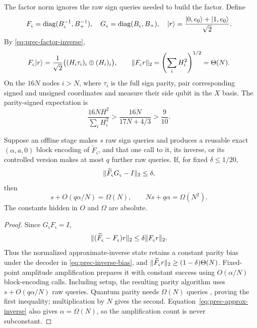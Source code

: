 The factor norm ignores the raw sign queries needed to build the factor.
Define
\begin{equation}
 F_\varsigma=\operatorname{diag}(B_\varsigma^{-1},B_+^{-1}),\quad
 G_\varsigma=\operatorname{diag}(B_\varsigma,B_+),\quad
 \lvert r\rangle=\frac{\lvert 0,e_0\rangle+\lvert 1,e_0\rangle}{\sqrt2}.            \label{eq:prec-FG}
\end{equation}
By \eqref{eq:prec-factor-inverse},
\begin{equation}
 F_\varsigma\lvert r\rangle
 =\frac1{\sqrt2}\bigl((H_i\tau_i)_i\oplus(H_i)_i\bigr),
 \qquad \lVert F_\varsigma r\rVert_2=\left(\sum_iH_i^2\right)^{1/2}=\Theta(N).
 \label{eq:prec-inverse-state}
\end{equation}
On the $16N$ nodes $i>N$, where $\tau_i$ is the full sign parity, pair
corresponding signed and unsigned coordinates and measure
their side qubit in the $X$ basis.  The parity-signed expectation is
\begin{equation}
 \frac{16NH^2}{\sum_iH_i^2}
 >\frac{16N}{17N+4/3}>\frac9{10}.             \label{eq:prec-inverse-bias}
\end{equation}

\begin{theorem}
\label{thm:prec-inverse-access}
Suppose an offline stage makes $s$ raw sign queries and produces a reusable
exact $(\alpha,a,0)$ block encoding of $\widetilde F_\varsigma$, and that one
call to it, its inverse, or its controlled version makes at most $q$ further
raw queries.
If, for fixed $\delta\leq1/20$,
\begin{equation}
 \lVert\widetilde F_\varsigma G_\varsigma-I\rVert_2\leq\delta, \label{eq:prec-inverse-promise}
\end{equation}
then
\begin{equation}
 \boxed{s+O(q\alpha/N)=\Omega(N)},\qquad
 \boxed{Ns+q\alpha=\Omega(N^2)}.             \label{eq:prec-inverse-product}
\end{equation}
The constants hidden in $O$ and $\Omega$ are absolute.
\end{theorem}

\begin{proof}
Since $G_\varsigma F_\varsigma=I$,
\[
 \lVert(\widetilde F_\varsigma-F_\varsigma)r\rVert_2
 \leq\delta\lVert F_\varsigma r\rVert_2.
\]
Thus the normalized approximate-inverse state retains a constant parity bias
under the decoder in \eqref{eq:prec-inverse-bias}, and
$\lVert\widetilde F_\varsigma r\rVert_2\geq(1-\delta)\Theta(N)$.
Fixed-point amplitude amplification prepares it with constant success using
$O(\alpha/N)$ block-encoding calls.  Including setup, the resulting parity
algorithm uses $s+O(q\alpha/N)$ raw queries.  Quantum parity needs
$\Omega(N)$ queries \cite{beals2001-quantum-lower-bounds-by-polynomials},
proving the first inequality; multiplication by $N$
gives the second.  Equation~\eqref{eq:prec-approx-inverse} also gives
$\alpha=\Omega(N)$, so the amplification count is never subconstant.
\end{proof}

